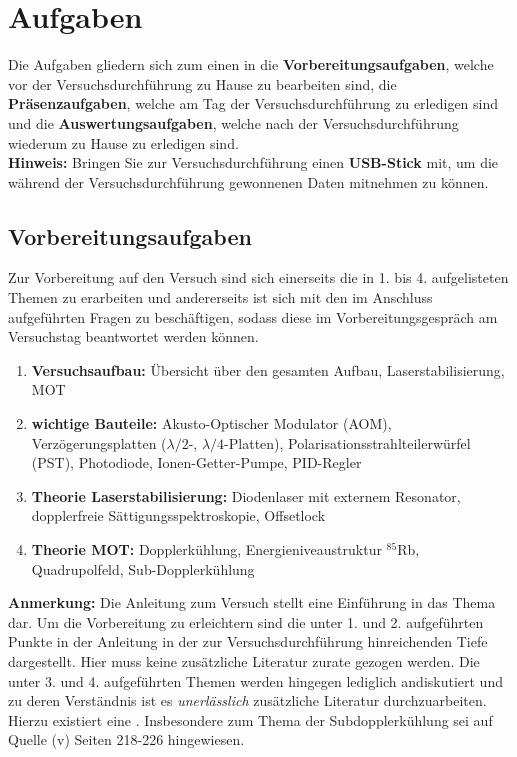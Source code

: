 \documentclass[
class=book,
accentcolor=1b,
custommargins=geometry,
fontsize=11pt,
thesis={type=Versuchsanleitung},
ruledheaders=all,
headline=false,
instbox=false,
marginpar=false,
title=small,
ignore-missing-data=true,
twoside=false,
logofile=apqdesign/tuda_logo.pdf,
pdfa=false %
]{apqpub}
\begin{document}
\newpage

\section{Aufgaben}

Die Aufgaben gliedern sich zum einen in die \textbf{Vorbereitungsaufgaben}, welche vor der Versuchsdurchführung zu Hause zu bearbeiten sind, die \textbf{Präsenzaufgaben}, welche am Tag der Versuchsdurchführung zu erledigen sind und die \textbf{Auswertungsaufgaben}, welche nach der Versuchsdurchführung wiederum zu Hause zu erledigen sind.\\

\textbf{Hinweis:} Bringen Sie zur Versuchsdurchführung einen  \textbf{USB-Stick} mit, um die während der Versuchsdurchführung gewonnenen Daten mitnehmen zu können.

\subsection{Vorbereitungsaufgaben}

Zur Vorbereitung auf den Versuch sind sich einerseits die in 1. bis 4. aufgelisteten Themen zu erarbeiten und andererseits ist sich mit den im Anschluss aufgeführten Fragen zu beschäftigen, sodass diese im Vorbereitungsgespräch am Versuchstag beantwortet werden können. 

\begin{enumerate}
	\item \textbf{Versuchsaufbau:} Übersicht über den gesamten Aufbau, Laserstabilisierung, MOT
	
	\item \textbf{wichtige Bauteile:} Akusto-Optischer Modulator (AOM), Verzögerungsplatten ($\lambda/2$-, $\lambda/4$-Platten), Polarisationsstrahlteilerwürfel (PST), Photodiode, Ionen-Getter-Pumpe, PID-Regler
	
	\item \textbf{Theorie Laserstabilisierung:} Diodenlaser mit externem Resonator, dopplerfreie Sättigungsspektroskopie, Offsetlock
	
	\item \textbf{Theorie MOT:} Dopplerkühlung, Energieniveaustruktur $^{85}$Rb, Quadrupolfeld, Sub-Dopplerkühlung   
\end{enumerate}

\textbf{Anmerkung:} Die Anleitung zum Versuch stellt eine Einführung in das Thema dar. Um die Vorbereitung zu erleichtern sind die unter 1. und 2. aufgeführten Punkte in der Anleitung in der zur Versuchsdurchführung hinreichenden Tiefe dargestellt. Hier muss keine zusätzliche Literatur zurate gezogen werden. Die unter 3. und 4. aufgeführten Themen werden hingegen lediglich andiskutiert und zu deren Verständnis ist es \textit{unerlässlich} zusätzliche Literatur durchzuarbeiten. Hierzu existiert eine . Insbesondere zum Thema der Subdopplerkühlung sei auf Quelle (v) Seiten 218-226 hingewiesen.\\
\end{document}
